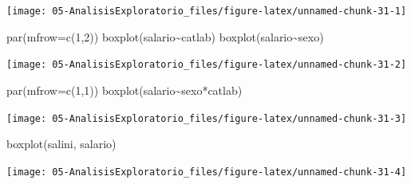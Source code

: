 \documentclass[
]{book}
\newenvironment{Shaded}{\begin{snugshade}}{\end{snugshade}}
\newcommand{\AttributeTok}[1]{\textcolor[rgb]{0.77,0.63,0.00}{#1}}
\newcommand{\DecValTok}[1]{\textcolor[rgb]{0.00,0.00,0.81}{#1}}
\newcommand{\FunctionTok}[1]{\textcolor[rgb]{0.00,0.00,0.00}{#1}}
\newcommand{\NormalTok}[1]{#1}
\newcommand{\SpecialCharTok}[1]{\textcolor[rgb]{0.00,0.00,0.00}{#1}}
\theoremstyle{break}
\begin{document}
\begin{center}\texttt{[image: 05-AnalisisExploratorio\_files/figure-latex/unnamed-chunk-31-1]} \end{center}

\begin{Shaded}
\begin{Highlighting}[]
\FunctionTok{par}\NormalTok{(}\AttributeTok{mfrow=}\FunctionTok{c}\NormalTok{(}\DecValTok{1}\NormalTok{,}\DecValTok{2}\NormalTok{))}
\FunctionTok{boxplot}\NormalTok{(salario}\SpecialCharTok{\textasciitilde{}}\NormalTok{catlab)}
\FunctionTok{boxplot}\NormalTok{(salario}\SpecialCharTok{\textasciitilde{}}\NormalTok{sexo)}
\end{Highlighting}
\end{Shaded}

\begin{center}\texttt{[image: 05-AnalisisExploratorio\_files/figure-latex/unnamed-chunk-31-2]} \end{center}

\begin{Shaded}
\begin{Highlighting}[]
\FunctionTok{par}\NormalTok{(}\AttributeTok{mfrow=}\FunctionTok{c}\NormalTok{(}\DecValTok{1}\NormalTok{,}\DecValTok{1}\NormalTok{))}
\FunctionTok{boxplot}\NormalTok{(salario}\SpecialCharTok{\textasciitilde{}}\NormalTok{sexo}\SpecialCharTok{*}\NormalTok{catlab)}
\end{Highlighting}
\end{Shaded}

\begin{center}\texttt{[image: 05-AnalisisExploratorio\_files/figure-latex/unnamed-chunk-31-3]} \end{center}

\begin{Shaded}
\begin{Highlighting}[]
\FunctionTok{boxplot}\NormalTok{(salini, salario)}
\end{Highlighting}
\end{Shaded}

\begin{center}\texttt{[image: 05-AnalisisExploratorio\_files/figure-latex/unnamed-chunk-31-4]} \end{center}
\end{document}
